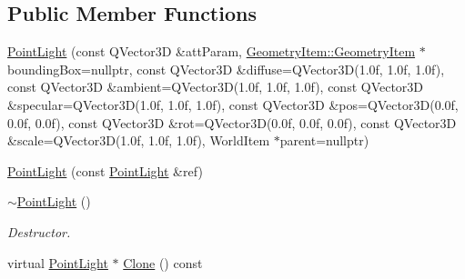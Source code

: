 \subsection*{Public Member Functions}
\begin{DoxyCompactItemize}
\item 
\mbox{\hyperlink{class_geometry_engine_1_1_geometry_world_item_1_1_geometry_light_1_1_point_light_aa9029eea56c5719db5ade7aad253f106}{Point\+Light}} (const Q\+Vector3D \&att\+Param, \mbox{\hyperlink{class_geometry_engine_1_1_geometry_world_item_1_1_geometry_item_1_1_geometry_item}{Geometry\+Item\+::\+Geometry\+Item}} $\ast$bounding\+Box=nullptr, const Q\+Vector3D \&diffuse=Q\+Vector3D(1.\+0f, 1.\+0f, 1.\+0f), const Q\+Vector3\+D \&ambient=\+Q\+Vector3\+D(1.\+0f, 1.\+0f, 1.\+0f), const Q\+Vector3\+D \&specular=\+Q\+Vector3\+D(1.\+0f, 1.\+0f, 1.\+0f), const Q\+Vector3\+D \&pos=\+Q\+Vector3\+D(0.\+0f, 0.\+0f, 0.\+0f), const Q\+Vector3\+D \&rot=\+Q\+Vector3\+D(0.\+0f, 0.\+0f, 0.\+0f), const Q\+Vector3\+D \&scale=\+Q\+Vector3\+D(1.\+0f, 1.\+0f, 1.\+0f), World\+Item $\ast$parent=nullptr)
\item 
\mbox{\hyperlink{class_geometry_engine_1_1_geometry_world_item_1_1_geometry_light_1_1_point_light_af70f4dc5a17066a9f46e8d98931a1204}{Point\+Light}} (const \mbox{\hyperlink{class_geometry_engine_1_1_geometry_world_item_1_1_geometry_light_1_1_point_light}{Point\+Light}} \&ref)
\item 
\mbox{\label{class_geometry_engine_1_1_geometry_world_item_1_1_geometry_light_1_1_point_light_a36e386c17ee8ddd000b5d85e5b8b3bfb}} 
\mbox{\hyperlink{class_geometry_engine_1_1_geometry_world_item_1_1_geometry_light_1_1_point_light_a36e386c17ee8ddd000b5d85e5b8b3bfb}{$\sim$\+Point\+Light}} ()
\begin{DoxyCompactList}\small\item\em Destructor. \end{DoxyCompactList}\item 
virtual \mbox{\hyperlink{class_geometry_engine_1_1_geometry_world_item_1_1_geometry_light_1_1_point_light}{Point\+Light}} $\ast$ \mbox{\hyperlink{class_geometry_engine_1_1_geometry_world_item_1_1_geometry_light_1_1_point_light_a68321b758cff76fa55f3cd5ef2824035}{Clone}} () const
\end{DoxyCompactItemize}
